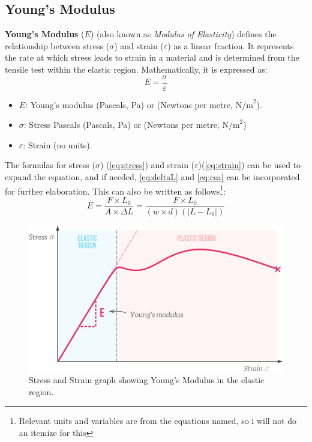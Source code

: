 \documentclass{article}
\begin{document}
    \subsection{Young's Modulus}
    \textbf{Young's Modulus} (\(E\)) (also known as \textit{Modulus of Elasticity}) defines the relationship between stress (\(\sigma\)) and strain (\(\varepsilon\)) as a linear fraction. It represents the rate at which stress leads to strain in a material and is determined from the tensile test within the elastic region. Mathematically, it is expressed as:
    \begin{equation}
        E = \frac{\sigma}{\varepsilon} 
        \label{eq:ym}
    \end{equation}
    \begin{itemize}[itemsep=-1mm]
        \item \( E \): Young's modulus (Pascals, Pa) or (Newtons per metre, \(\text{N/m}^2\)).
        \item \( \sigma \): Stress Pascals (Pascals, Pa) or (Newtons per metre, \(\text{N/m}^2\))
        \item \( \varepsilon \): Strain (no units).
    \end{itemize}    
    The formulas for stress (\( \sigma \)) (\ref{eq:stress}) and strain (\( \varepsilon \))(\ref{eq:strain}) can be used to expand the equation, and if needed, \ref{eq:deltaL} and \ref{eq:csa} can be incorporated for further elaboration. This can also be written as follows\footnote{Relevant units and variables are from the equations named, so i will not do an itemize for this}:
    \begin{equation}
        E = \frac{F \times L_0}{A\times\Delta L} = \frac{F \times L_0}{\left(w\times d\right)\left(|L-L_0|\right)}
    \end{equation}
{\begin{minipage}{0.5\textwidth}
    \begin{figure}[H]
        \centering
        \includegraphics[width=1\textwidth]{images/stress-strain-youngs-modulus2.jpg}
        \caption{Stress and Strain graph showing Young's Modulus in the elastic region.}
        \label{fig:young}
    \end{figure}
\end{minipage}}\hspace{1em}
\end{document}

